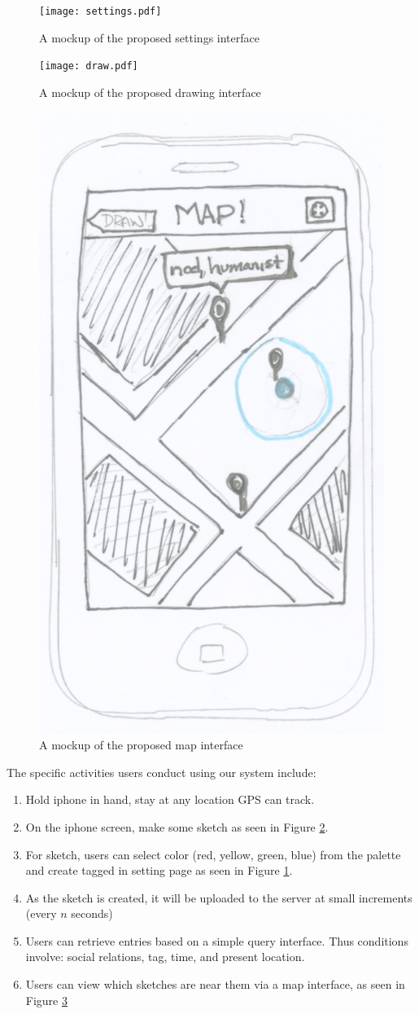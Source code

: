 \documentclass{chi2009}
\begin{document}
\begin{figure}
\centering
\texttt{[image: settings.pdf]}
\caption{A mockup of the proposed settings interface}
\label{fig:settings}
\end{figure}

\begin{figure}
\centering
\texttt{[image: draw.pdf]}
\caption{A mockup of the proposed drawing interface}
\label{fig:draw}
\end{figure}

\begin{figure}
\centering
\includegraphics[width=.3\textwidth]{map.pdf}
\caption{A mockup of the proposed map interface}
\label{fig:map}
\end{figure}

The specific activities users conduct using our system include:
\begin{enumerate}
\item Hold iphone in hand, stay at any location GPS can track.
\item On the iphone screen, make some sketch as seen in Figure \ref{fig:draw}.
\item For sketch, users can select color (red, yellow, green, blue) from the palette and create tagged in setting page as seen in Figure \ref{fig:settings}.
\item As the sketch is created, it will be uploaded to the server at small
	increments (every $n$ seconds)
\item Users can retrieve entries based on a simple query interface. Thus
	conditions involve: social relations, tag, time, and present location.
\item Users can view which sketches are near them via a map interface, as seen
	in Figure \ref{fig:map}
\end{enumerate}
\end{document}
